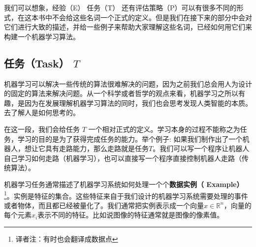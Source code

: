 我们可以想象，经验（E） 任务（T） 还有评估策略（P）可以有很多不同的形式，在这本书中不会给这些名词一个正式的定义。但是我们在接下来的部分中会对它们进行大致的描述，并给一些例子来帮助大家理解这些名词，已经如何用它们来构建一个机器学习算法。

\subsection{任务（Task） $T$}
机器学习可以解决一些传统的算法很难解决的问题，因为之前我们总会用人为设计的固定的算法来解决问题。从一个科学或者哲学的观点来看，机器学习之所以有趣，是因为在发展理解机器学习算法的同时，我们也会思考发现人类智能的本质。去了解人是如何思考的。

在这一段，我们会给任务 $T$ 一个相对正式的定义。学习本身的过程不能称之为任务，学习的目的是为了获得完成任务的能力。举个例子: 如果我们制作出了一个机器人，想让它具有走路能力，那么走路就是任务$T$。我们可以写一个程序让机器人自己学习如何走路（机器学习），也可以直接写一个程序直接控制机器人走路（传统算法）。

机器学习任务通常描述了机器学习系统如何处理一个个\textbf{数据实例（ Example）}\footnote{译者注：有时也会翻译成数据点}。实例是特征的集合。这些特征来自于我们设计的机器学习系统需要处理的事件或者物体，而且都已经被量化了。我们通常把实例表示成一个向量$x\in \mathbb{R}^{n}$，向量的每个元素$x_i$表示不同的特征。比如说图像的特征通常就是图像的像素值。

